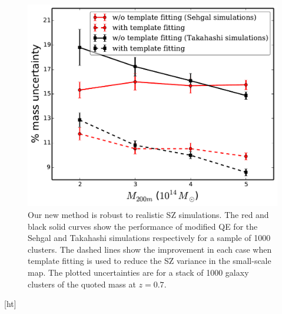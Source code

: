 \begin{figure}[htb]
\includegraphics[width=\linewidth, keepaspectratio]{figs/Daisuke_Sehgal_results.pdf}
 \caption{
Our new method is robust to realistic SZ simulations. 
The red and black solid curves show the performance of modified QE for the Sehgal and Takahashi simulations respectively for a sample of 1000 clusters. 
The dashed lines show the improvement in each case when template fitting is used to reduce the SZ variance in the small-scale map. 
The plotted uncertainties are for a stack of 1000 galaxy clusters of the quoted mass at $z=0.7$. 
 }
\label{fig:realistic_sims}
\end{figure}[ht]



